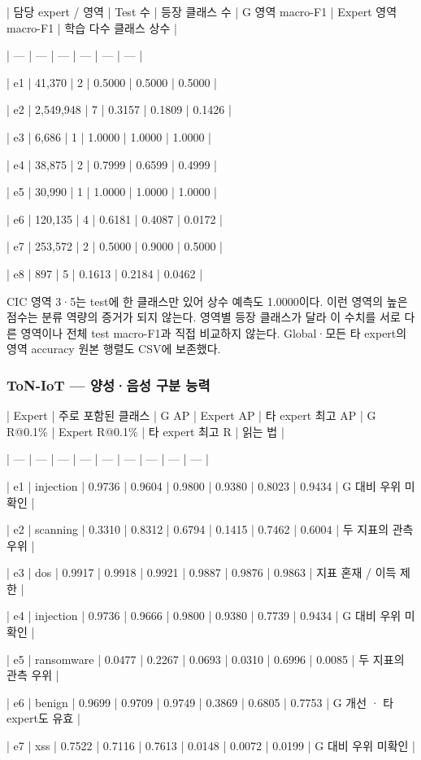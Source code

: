 | 담당 expert /\allowbreak{} 영역 | Test 수 | 등장 클래스 수 | G 영역 macro-F1 | Expert 영역 macro-F1 | 학습 다수 클래스 상수 |

| --- | --- | --- | --- | --- | --- |

| e1 | 41,370 | 2 | 0.5000 | 0.5000 | 0.5000 |

| e2 | 2,549,948 | 7 | 0.3157 | 0.1809 | 0.1426 |

| e3 | 6,686 | 1 | 1.0000 | 1.0000 | 1.0000 |

| e4 | 38,875 | 2 | 0.7999 | 0.6599 | 0.4999 |

| e5 | 30,990 | 1 | 1.0000 | 1.0000 | 1.0000 |

| e6 | 120,135 | 4 | 0.6181 | 0.4087 | 0.0172 |

| e7 | 253,572 | 2 | 0.5000 | 0.9000 | 0.5000 |

| e8 | 897 | 5 | 0.1613 | 0.2184 | 0.0462 |

CIC 영역 3·5는 test에 한 클래스만 있어 상수 예측도 1.0000이다. 이런 영역의 높은 점수는 분류 역량의 증거가 되지 않는다. 영역별 등장 클래스가 달라 이 수치를 서로 다른 영역이나 전체 test macro-F1과 직접 비교하지 않는다. Global·모든 타 expert의 영역 accuracy 원본 행렬도 CSV에 보존했다.

\subsubsection{ToN-IoT — 양성·음성 구분 능력}
| Expert | 주로 포함된 클래스 | G AP | Expert AP | 타 expert 최고 AP | G R@0.1\% | Expert R@0.1\% | 타 expert 최고 R | 읽는 법 |

| --- | --- | --- | --- | --- | --- | --- | --- | --- |

| e1 | injection | 0.9736 | 0.9604 | 0.9800 | 0.9380 | 0.8023 | 0.9434 | G 대비 우위 미확인 |

| e2 | scanning | 0.3310 | 0.8312 | 0.6794 | 0.1415 | 0.7462 | 0.6004 | 두 지표의 관측 우위 |

| e3 | dos | 0.9917 | 0.9918 | 0.9921 | 0.9887 | 0.9876 | 0.9863 | 지표 혼재 /\allowbreak{} 이득 제한 |

| e4 | injection | 0.9736 | 0.9666 | 0.9800 | 0.9380 | 0.7739 | 0.9434 | G 대비 우위 미확인 |

| e5 | ransomware | 0.0477 | 0.2267 | 0.0693 | 0.0310 | 0.6996 | 0.0085 | 두 지표의 관측 우위 |

| e6 | benign | 0.9699 | 0.9709 | 0.9749 | 0.3869 | 0.6805 | 0.7753 | G 개선 · 타 expert도 유효 |

| e7 | xss | 0.7522 | 0.7116 | 0.7613 | 0.0148 | 0.0072 | 0.0199 | G 대비 우위 미확인 |

